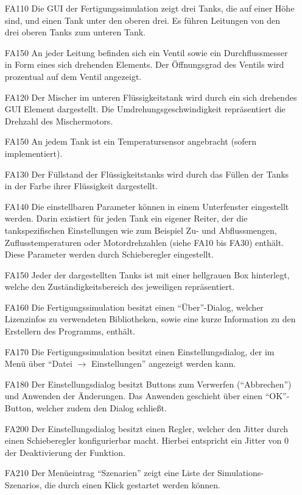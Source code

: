 \documentclass[parskip=full]{scrartcl}
\begin{document}
\begin{enumerate}
  \item[FA110] Die \gls{GUI} der \gls{Fertigungssimulation} zeigt drei Tanks, die auf einer Höhe sind, und einen Tank unter den oberen drei.
    Es führen Leitungen von den drei oberen Tanks zum unteren Tank.
  \item[FA150] An jeder Leitung befinden sich ein Ventil sowie ein Durchflussmesser in Form eines sich drehenden Elements. Der Öffnungsgrad des Ventils wird prozentual auf dem Ventil angezeigt.
  \item[FA120] Der Mischer im unteren Flüssigkeitstank wird durch ein sich drehendes GUI Element dargestellt.
    Die Umdrehungsgeschwindigkeit repräsentiert die Drehzahl des Mischermotors.
  \item[FA150] An jedem Tank ist ein Temperatursensor angebracht (sofern implementiert).
  \item[FA130] Der Füllstand der Flüssigkeitstanks wird durch das Füllen der Tanks in der Farbe ihrer Flüssigkeit dargestellt.
  \item[FA140] Die einstellbaren Parameter können in einem Unterfenster eingestellt werden. Darin existiert für jeden Tank ein eigener Reiter, der die 
    tankspezifischen Einstellungen wie zum Beispiel Zu- und Abflussmengen, Zuflusstemperaturen oder Motordrehzahlen (siehe FA10 bis FA30) enthält.
    Diese Parameter werden durch Schieberegler eingestellt.
  \item[FA150] Jeder der dargestellten Tanks ist mit einer hellgrauen Box hinterlegt, welche den Zuständigkeitsbereich des jeweiligen  repräsentiert.
  \item[FA160] Die \gls{Fertigungssimulation} besitzt einen "`Über"'-Dialog, welcher Lizenzinfos zu verwendeten Bibliotheken,
    sowie eine kurze Information zu den Erstellern des Programms, enthält.
  \item[FA170] Die \gls{Fertigungssimulation} besitzt einen Einstellungsdialog, der im Menü über "`Datei $\rightarrow$ Einstellungen"' angezeigt werden kann.
  \item[FA180] Der Einstellungsdialog besitzt Buttons zum Verwerfen ("`Abbrechen"') und Anwenden der Änderungen. Das Anwenden geschieht über einen "`OK"'-Button, welcher zudem den Dialog schließt.
  \item[FA200] Der Einstellungsdialog besitzt einen Regler, welcher den \gls{Jitter} durch einen Schieberegler konfigurierbar macht.
    Hierbei entspricht ein \gls{Jitter} von 0 der Deaktivierung der Funktion.
  \item[FA210] Der Menüeintrag "`Szenarien"' zeigt eine Liste der \glspl{Simulations-Szenario}, die durch einen Klick gestartet werden können.
\end{enumerate}
\end{document}
